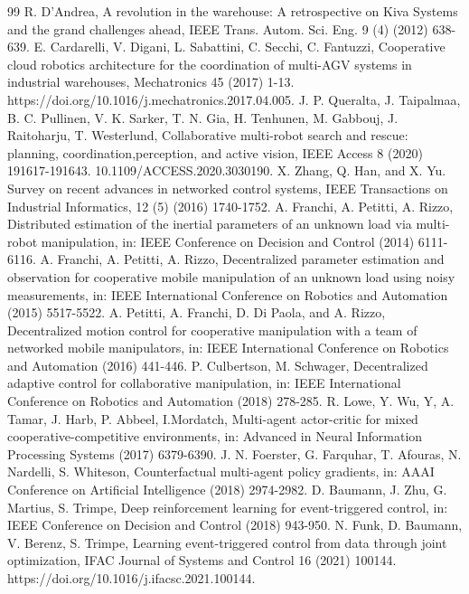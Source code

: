 \documentclass[letterpaper, 10 pt, conference]{ieeeconf} %
\begin{document}
\begin{thebibliography}{99}
 R. D'Andrea, A revolution in the warehouse: A retrospective on Kiva Systems and the grand challenges ahead, IEEE Trans. Autom. Sci. Eng. 9 (4) (2012) 638-639.
 E. Cardarelli, V. Digani, L. Sabattini, C. Secchi, C. Fantuzzi, Cooperative cloud robotics architecture for the coordination of multi-AGV systems in industrial warehouses, Mechatronics 45 (2017) 1-13. https://doi.org/10.1016/j.mechatronics.2017.04.005.
 J. P. Queralta, J. Taipalmaa, B. C. Pullinen, V. K. Sarker, T. N. Gia, H. Tenhunen, M. Gabbouj, J. Raitoharju, T. Westerlund, Collaborative multi-robot search and rescue: planning, coordination,perception, and active vision, IEEE Access 8 (2020) 191617-191643. 10.1109/ACCESS.2020.3030190.
 X. Zhang, Q. Han, and X. Yu. Survey on recent advances in networked control systems, IEEE Transactions on Industrial Informatics, 12 (5) (2016) 1740-1752.
 A. Franchi, A. Petitti, A. Rizzo, Distributed estimation of the inertial parameters of an unknown load via multi-robot manipulation, in: IEEE Conference on Decision and Control (2014) 6111-6116.
 A. Franchi, A. Petitti, A. Rizzo, Decentralized parameter estimation and observation for cooperative mobile manipulation of an unknown load using noisy measurements, in: IEEE International Conference on Robotics and Automation (2015) 5517-5522.
 A. Petitti, A. Franchi, D. Di Paola, and A. Rizzo, Decentralized motion control for cooperative manipulation with a team of networked mobile manipulators, in: IEEE International Conference on Robotics and Automation (2016) 441-446.
 P. Culbertson, M. Schwager, Decentralized adaptive control for collaborative manipulation, in: IEEE International Conference on Robotics and Automation (2018) 278-285.
 R. Lowe, Y. Wu, Y, A. Tamar, J. Harb, P. Abbeel, I.Mordatch, Multi-agent actor-critic for mixed cooperative-competitive environments, in: Advanced in Neural Information Processing Systems (2017) 6379-6390.
 J. N. Foerster, G. Farquhar, T. Afouras, N. Nardelli, S. Whiteson, Counterfactual multi-agent policy gradients, in: AAAI Conference on Artificial Intelligence (2018) 2974-2982.
 D. Baumann, J. Zhu, G. Martius, S. Trimpe, Deep reinforcement learning for event-triggered control, in: IEEE Conference on Decision and Control (2018) 943-950.
 N. Funk, D. Baumann, V. Berenz, S. Trimpe, Learning event-triggered control from data through joint optimization, IFAC Journal of Systems and Control 16 (2021) 100144. https://doi.org/10.1016/j.ifacsc.2021.100144.

\end{thebibliography}
\end{document}
